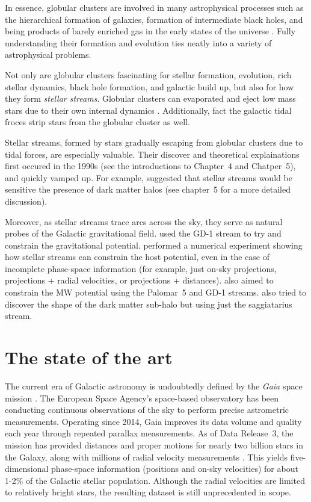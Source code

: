    In essence, globular clusters are involved in many astrophysical processes such as the hierarchical formation of galaxies, formation of intermediate black holes, and being products of barely enriched gas in the early states of the universe \citep{2016ApJ...823...52K,2025arXiv250116438K}. Fully understanding their formation and evolution ties neatly into a variety of astrophysical problems.

    Not only are globular clusters fascinating for stellar formation, evolution, rich stellar dynamics, black hole formation, and galactic build up, but also for how they form \textit{stellar streams}. Globular clusters can evaporated and eject low mass stars due to their own internal dynamics \citep{2003gmbp.book.....H}. Additionally, fact the galactic tidal froces strip stars from the globular cluster as well. 
    
    Stellar streams, formed by stars gradually escaping from globular clusters due to tidal forces, are especially valuable. Their discover and theoretical explainations first occured in the 1990s (see the introductions to Chapter~4 and Chatper~5), and quickly vamped up. For example, \citet{2002MNRAS.332..915I} suggested that stellar streams would be sensitive the presence of dark matter halos (see chapter~5 for a more detailed discussion). 
    
    Moreover, as stellar streams trace arcs across the sky, they serve as natural probes of the Galactic gravitational field. \citet{2010ApJ...712..260K} used the GD-1 stream to try and constrain the gravitational potential. \citep{2011MNRAS.417..198V} performed a numerical experiment showing how stellar streams can constrain the host potential, even in the case of incomplete phase-space information (for example, just on-sky projections, projections + radial velocities, or projections + distances). \citet{2016ApJ...833...31B} also aimed to constrain the MW potential using the Palomar~5 and GD-1 streams. \citet{2010ApJ...718.1128L} also tried to discover the shape of the dark matter sub-halo but using just the saggiatarius stream. 

\section{The state of the art}
    The current era of Galactic astronomy is undoubtedly defined by the \emph{Gaia} space mission \citep{2016A&A...595A...1G,2016A&A...595A...2G,2018A&A...616A...1G,2021A&A...650C...3G,2023A&A...674A...1G}. The European Space Agency's space-based observatory has been conducting continuous observations of the sky to perform precise astrometric measurements. Operating since 2014, Gaia improves its data volume and quality each year through repeated parallax measurements.  As of Data Release~3, the mission has provided distances and proper motions for nearly two billion stars in the Galaxy, along with millions of radial velocity measurements \citep{2023A&A...674A...1G}. This yields five-dimensional phase-space information (positions and on-sky velocities) for about 1-2\% of the Galactic stellar population. Although the radial velocities are limited to relatively bright stars, the resulting dataset is still unprecedented in scope.

